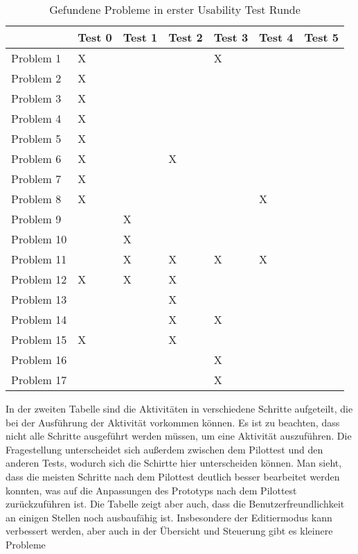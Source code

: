 \begin{table}[H]
\caption{Gefundene Probleme in erster Usability Test Runde}
    \begin{tabular}{l||l|l|l|l|l|l}
                & Test 0 & Test 1 & Test 2 & Test 3 & Test 4 & Test 5 \\ \hline
    Problem 1   & X      &        &        & X      &        &        \\
    Problem 2   & X      &        &        &        &        &        \\
    Problem 3   & X      &        &        &        &        &        \\
    Problem 4   & X      &        &        &        &        &        \\
    Problem 5   & X      &        &        &        &        &        \\
    Problem 6   & X      &        & X      &        &        &        \\
    Problem 7   & X      &        &        &        &        &        \\
    Problem 8   & X      &        &        &        & X      &        \\
    Problem 9   &        & X      &        &        &        &        \\
    Problem 10  &        & X      &        &        &        &        \\
    Problem 11  &        & X      & X      & X      & X      &        \\
    Problem 12  & X      & X      & X      &        &        &        \\
    Problem 13  &        &        & X      &        &        &        \\
    Problem 14  &        &        & X      & X      &        &        \\
    Problem 15  & X      &        & X      &        &        &        \\
    Problem 16  &        &        &        & X      &        &        \\
    Problem 17  &        &        &        & X      &        &        \\ \hline
    \end{tabular}    
\end{table}

In der zweiten Tabelle sind die Aktivitäten in verschiedene Schritte aufgeteilt, die bei der Ausführung der Aktivität vorkommen können. Es ist zu beachten, dass nicht alle Schritte ausgeführt werden müssen, um eine Aktivität auszuführen. Die Fragestellung unterscheidet sich außerdem zwischen dem Pilottest und den anderen Tests, wodurch sich die Schirtte hier unterscheiden können. Man sieht, dass die meisten Schritte nach dem Pilottest deutlich besser bearbeitet werden konnten, was auf die Anpassungen des Prototyps nach dem Pilottest zurückzuführen ist. Die Tabelle zeigt aber auch, dass die Benutzerfreundlichkeit an einigen Stellen noch ausbaufähig ist. Insbesondere der Editiermodus kann verbessert werden, aber auch in der Übersicht und Steuerung gibt es kleinere Probleme

